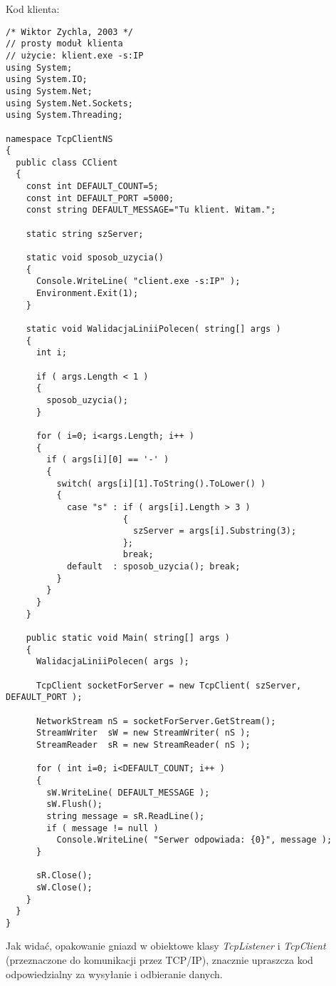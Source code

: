 Kod klienta:

\begin{scriptsize}
\begin{verbatim}
/* Wiktor Zychla, 2003 */
// prosty moduł klienta
// użycie: klient.exe -s:IP
using System;
using System.IO;
using System.Net;
using System.Net.Sockets;
using System.Threading;

namespace TcpClientNS
{
  public class CClient
  {
    const int DEFAULT_COUNT=5;
    const int DEFAULT_PORT =5000;
    const string DEFAULT_MESSAGE="Tu klient. Witam.";

    static string szServer;

    static void sposob_uzycia()
    {
      Console.WriteLine( "client.exe -s:IP" );
      Environment.Exit(1);
    }

    static void WalidacjaLiniiPolecen( string[] args )
    {
      int i;

      if ( args.Length < 1 )
      {
        sposob_uzycia();
      }
	  
      for ( i=0; i<args.Length; i++ )
      {
        if ( args[i][0] == '-' )
        {
          switch( args[i][1].ToString().ToLower() )
          {
            case "s" : if ( args[i].Length > 3 )
                       {
                         szServer = args[i].Substring(3); 					     
                       };
                       break;
            default  : sposob_uzycia(); break;
          }
        }
      }
    }

    public static void Main( string[] args )
    {
      WalidacjaLiniiPolecen( args );

      TcpClient socketForServer = new TcpClient( szServer, DEFAULT_PORT );

      NetworkStream nS = socketForServer.GetStream();
      StreamWriter  sW = new StreamWriter( nS );
      StreamReader  sR = new StreamReader( nS );

      for ( int i=0; i<DEFAULT_COUNT; i++ )
      {
        sW.WriteLine( DEFAULT_MESSAGE );
        sW.Flush();
        string message = sR.ReadLine();
        if ( message != null )
          Console.WriteLine( "Serwer odpowiada: {0}", message ); 
      }

      sR.Close();
      sW.Close();
    }
  }  
}
\end{verbatim}
\end{scriptsize}

Jak widać, opakowanie gniazd w obiektowe klasy {\em TcpListener} i {\em TcpClient} (przeznaczone
do komunikacji przez TCP/IP), znacznie upraszcza kod odpowiedzialny za wysyłanie i odbieranie danych.

